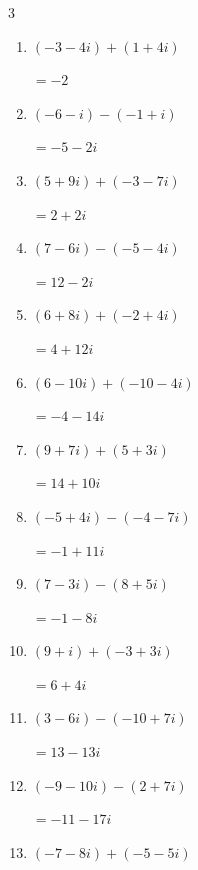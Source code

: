\begin{multicols}{3}
\begin{enumerate}
        $\displaystyle =4+9i$

  \item $\displaystyle (-3-4i) + (1+4i)$

        $\displaystyle =-2$

  \item $\displaystyle (-6-i) - (-1+i)$

        $\displaystyle =-5-2i$

  \item $\displaystyle (5+9i) + (-3-7i)$

        $\displaystyle =2+2i$

\columnbreak %

\resetques

  \item $\displaystyle (7-6i) - (-5-4i)$

        $\displaystyle =12-2i$

  \item $\displaystyle (6+8i) + (-2+4i)$

        $\displaystyle =4+12i$

  \item $\displaystyle (6-10i) + (-10-4i)$

        $\displaystyle =-4-14i$

  \item $\displaystyle (9+7i) + (5+3i)$

        $\displaystyle =14+10i$

  \item $\displaystyle (-5+4i) - (-4-7i)$

        $\displaystyle =-1+11i$

  \item $\displaystyle (7-3i) - (8+5i)$

        $\displaystyle =-1-8i$

  \item $\displaystyle (9+i) + (-3+3i)$

        $\displaystyle =6+4i$

  \item $\displaystyle (3-6i) - (-10+7i)$

        $\displaystyle =13-13i$

  \item $\displaystyle (-9-10i) - (2+7i)$

        $\displaystyle =-11-17i$

  \item $\displaystyle (-7-8i) + (-5-5i)$


\end{enumerate}
\end{multicols}
